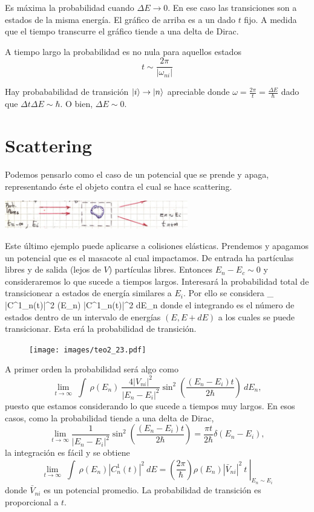 \documentclass[10pt,oneside]{CBFT_book}
\begin{document}
Es máxima la probabilidad cuando $\Delta E\to 0$. 
En ese caso las transiciones son a estados de la misma energía. 
El gráfico de arriba es a un dado $t$ fijo. A medida que el tiempo transcurre el gráfico
tiende a una delta de Dirac.

A tiempo largo la probabilidad es no nula para aquellos estados 
\[
	t \sim \frac{2\pi}{|\omega_{ni}|}
\]

Hay probababilidad de transición $\Ket{i} \to \Ket{n}$ apreciable donde $\omega = \frac{2\pi}{t}
= \frac{\Delta E}{\hbar}$ dado que $\Delta t \Delta E \sim \hbar $. O bien, $\Delta E \sim 0$.

\section{Scattering}

Podemos pensarlo como el caso de un potencial que se prende y apaga, representando éste el objeto
contra el cual se hace scattering.

\includegraphics[width=0.6\textwidth]{images/fig_ft2_scattering_intro.jpg}

Este último ejemplo puede aplicarse a colisiones elásticas. Prendemos y apagamos un potencial que es el 
masacote al cual impactamos. De entrada ha partículas libres y de salida (lejos de $V$) partículas libres.
Entonces $ E_n - E_c \sim 0$ y consideraremos lo que sucede a tiempos largos. Interesará la probabilidad 
total de transicionear a estados de energía similares a $E_i$. Por ello se considera 
\be
	\sum_{} |C^1_n(t)|^2 
	\longrightarrow 
	\int \: \rho(E_n) \: |C^1_n(t)|^2 \: dE_n
	\label{scattering_integral}
\ee
donde el integrando es el número de estados dentro de un intervalo de energías $(E,E+dE)$ a los cuales
se puede transicionar. Esta erá la probabilidad de transición.

\begin{figure}[htb]
	\begin{center}
	\texttt{[image: images/teo2\_23.pdf]}
	\end{center}
	\caption{}
\end{figure} 

A primer orden la probabilidad será algo como
\[
	\lim_{t\to\infty} \; \int \: \rho(E_n) \: \frac{4|V_{ni}|^2}{| E_n - E_i|^2}
	\sin^2\left(\frac{(E_n - E_i)t}{2\hbar}\right) \: dE_n,
\]
puesto que estamos considerando lo que sucede a tiempos muy largos.
En esos casos, como la probabilidad tiende a una delta de Dirac, 
\[
	\lim_{t\to\infty} \frac{1}{| E_n - E_i|^2}
	\sin^2\left(\frac{(E_n - E_i)t}{2\hbar}\right) = \frac{\pi t}{2\hbar} \delta(E_n - E_i),
\]
la integración es fácil y se obtiene
\[
	\lim_{t\to\infty} \; \int \: \rho(E_n) |C^1_n(t)|^2 \: dE = 
	\left.\left(\frac{2\pi}{\hbar}\right) \rho(E_n) |\bar{V}_{ni}|^2 \: t \: \right|_{E_n\sim E_i}
\]
donde $\bar{V}_{ni}$ es un potencial promedio. La probabilidad de transición es proporcional a $t$. 
\end{document}
